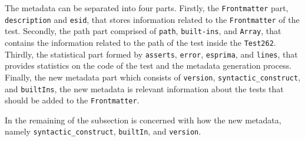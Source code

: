 \documentclass[runningheads]{llncs}
\begin{document}
The metadata can be separated into four parts. Firstly, the \texttt{Frontmatter} part, \texttt{description} and \texttt{esid}, that stores information related to the \texttt{Frontmatter} of the test. Secondly, the path part comprised of \texttt{path}, \texttt{built-ins}, and \texttt{Array}, that contains the information related to the path of the test inside the \texttt{Test262}. Thirdly, the statistical part formed by \texttt{asserts}, \texttt{error}, \texttt{esprima}, and \texttt{lines}, that provides statistics on the code of the test and the metadata generation process.
%
Finally, the new metadata part which consists of \texttt{version}, \texttt{syntactic\_construct}, and \texttt{builtIns}, the new metadata is relevant information about the tests that should be added to the \texttt{Frontmatter}.



In the remaining of the subsection is concerned with how the new metadata, namely \texttt{syntactic\_construct}, \texttt{builtIn}, and \texttt{version}.


\end{document}
